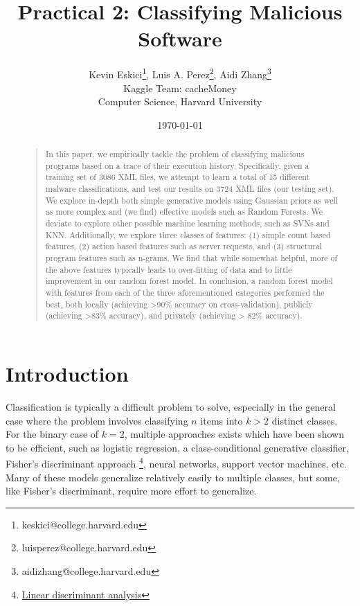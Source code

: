 \documentclass[letterpaper]{article}
\title{Practical 2: Classifying Malicious Software}
\author{Kevin Eskici\thanks{keskici@college.harvard.edu}, Luis A. Perez\thanks{luisperez@college.harvard.edu}, Aidi Zhang\thanks{aidizhang@college.harvard.edu} \\
Kaggle Team: cacheMoney \\
Computer Science, Harvard University}
\date{\today}
\begin{document}
\maketitle

\begin{abstract}
\begin{quote}
In this paper, we empirically tackle the problem of classifying malicious programs based on a trace of their execution history. Specifically, given a training set of 3086 XML files, we attempt to learn a total of 15 different malware classifications, and test our results on 3724 XML files (our testing set). We explore in-depth both simple generative models using Gaussian priors as well as more complex and (we find) effective models such as Random Forests. We deviate to explore other possible machine learning methods, such as SVNs and KNN. Additionally, we explore three classes of features: (1) simple count based features, (2) action based features such as server requests, and (3) structural program features such as n-grams. We find that while somewhat helpful, more of the above features typically leads to over-fitting of data and to little improvement in our random forest model. In conclusion, a random forest model with features from each of the three aforementioned categories performed the best, both locally (achieving >90\% accuracy on cross-validation), publicly (achieving >83\% accuracy), and privately (achieving > 82\% accuracy).  
\end{quote}
\end{abstract}

\section{Introduction}

\noindent Classification is typically a difficult problem to solve, especially in the general case where the problem involves classifying $n$ items into $k > 2$ distinct classes. For the binary case of $k=2$, multiple approaches exists which have been shown to be efficient, such as logistic regression, a class-conditional generative classifier, Fisher's discriminant approach \footnote{\href{http://research.cs.tamu.edu/prism/lectures/pr/pr_l10.pdf}{Linear discriminant analysis}}, neural networks, support vector machines, etc. Many of these models generalize relatively easily to multiple classes, but some, like Fisher's discriminant, require more effort to generalize. \\
\end{document}
